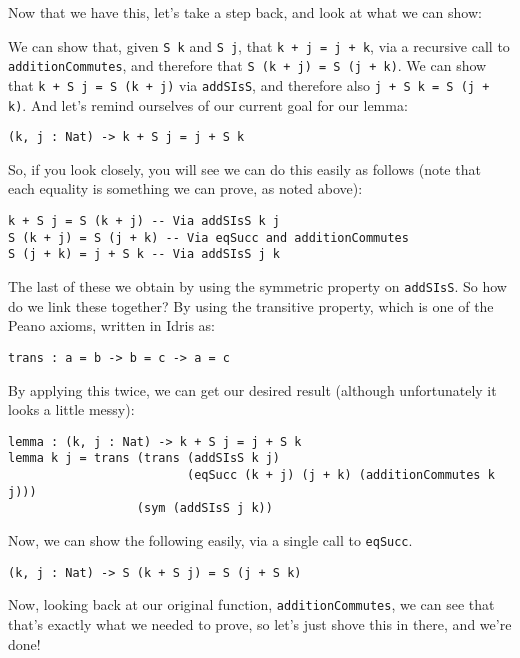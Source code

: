 \documentclass{article}
\newcommand{\inline}[1]{\texttt{#1}}
\begin{document}
Now that we have this, let’s take a step back, and look at what we can show:

We can show that, given \inline{S k} and \inline{S j}, that \inline{k + j = j + k}, via a recursive call to \inline{additionCommutes}, and therefore that \inline{S (k + j) = S (j + k)}.
We can show that \inline{k + S j = S (k + j)} via \inline{addSIsS}, and therefore also \inline{j + S k = S (j + k)}.
And let’s remind ourselves of our current goal for our lemma:

\begin{verbatim}
(k, j : Nat) -> k + S j = j + S k
\end{verbatim}

So, if you look closely, you will see we can do this easily as follows (note that each equality is something we can prove, as noted above):

\begin{verbatim}
k + S j = S (k + j) -- Via addSIsS k j
S (k + j) = S (j + k) -- Via eqSucc and additionCommutes
S (j + k) = j + S k -- Via addSIsS j k
\end{verbatim}

The last of these we obtain by using the symmetric property on \inline{addSIsS}.
So how do we link these together?
By using the transitive property, which is one of the Peano axioms, written in Idris as:

\begin{verbatim}
trans : a = b -> b = c -> a = c
\end{verbatim}

By applying this twice, we can get our desired result (although unfortunately it looks a little messy):

\begin{verbatim}
lemma : (k, j : Nat) -> k + S j = j + S k
lemma k j = trans (trans (addSIsS k j)
                         (eqSucc (k + j) (j + k) (additionCommutes k j)))
                  (sym (addSIsS j k))
\end{verbatim}

Now, we can show the following easily, via a single call to \inline{eqSucc}.

\begin{verbatim}
(k, j : Nat) -> S (k + S j) = S (j + S k)
\end{verbatim}

Now, looking back at our original function, \inline{additionCommutes}, we can see that that’s exactly what we needed to prove, so let’s just shove this in there, and we’re done!
\end{document}
